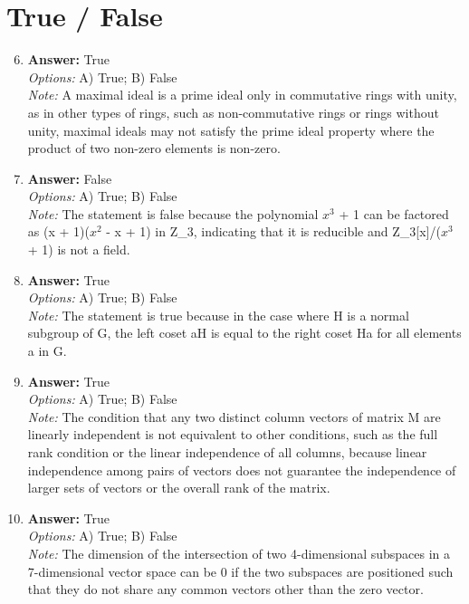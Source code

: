 \documentclass[12pt]{article}
\begin{document}
\section*{True / False}
\begin{enumerate}[label=\arabic*.]
\setcounter{enumi}{5}
\item \textbf{Answer:} True
\\ \textit{Options:} A) True; B) False
\\ \textit{Note:} A maximal ideal is a prime ideal only in commutative rings with unity, as in other types of rings, such as non-commutative rings or rings without unity, maximal ideals may not satisfy the prime ideal property where the product of two non-zero elements is non-zero.
\item \textbf{Answer:} False
\\ \textit{Options:} A) True; B) False
\\ \textit{Note:} The statement is false because the polynomial $x^3$ + 1 can be factored as (x + 1)($x^2$ - x + 1) in Z\_3, indicating that it is reducible and Z\_3[x]/($x^3$ + 1) is not a field.
\item \textbf{Answer:} True
\\ \textit{Options:} A) True; B) False
\\ \textit{Note:} The statement is true because in the case where H is a normal subgroup of G, the left coset aH is equal to the right coset Ha for all elements a in G.
\item \textbf{Answer:} True
\\ \textit{Options:} A) True; B) False
\\ \textit{Note:} The condition that any two distinct column vectors of matrix M are linearly independent is not equivalent to other conditions, such as the full rank condition or the linear independence of all columns, because linear independence among pairs of vectors does not guarantee the independence of larger sets of vectors or the overall rank of the matrix.
\item \textbf{Answer:} True
\\ \textit{Options:} A) True; B) False
\\ \textit{Note:} The dimension of the intersection of two 4-dimensional subspaces in a 7-dimensional vector space can be 0 if the two subspaces are positioned such that they do not share any common vectors other than the zero vector.
\end{enumerate}
\end{document}
